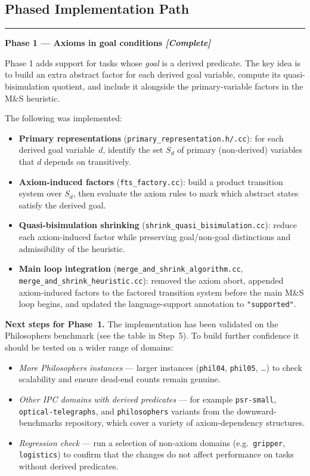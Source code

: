 \documentclass[11pt,a4paper]{article}
\begin{document}
\subsection{Phased Implementation Path}

\hrule\medskip
\noindent\textbf{Phase 1 — Axioms in goal conditions \hfill\textit{[Complete]}}
\medskip

Phase 1 adds support for tasks whose \emph{goal} is a derived predicate.  The
key idea is to build an extra abstract factor for each derived goal variable,
compute its quasi-bisimulation quotient, and include it alongside the
primary-variable factors in the M\&S heuristic.

The following was implemented:

\begin{itemize}
  \item \textbf{Primary representations} (\texttt{primary\_representation.h/.cc}):
    for each derived goal variable~$d$, identify the set $S_d$ of primary
    (non-derived) variables that $d$ depends on transitively.
  \item \textbf{Axiom-induced factors} (\texttt{fts\_factory.cc}): build a
    product transition system over $S_d$, then evaluate the axiom rules to
    mark which abstract states satisfy the derived goal.
  \item \textbf{Quasi-bisimulation shrinking}
    (\texttt{shrink\_quasi\_bisimulation.cc}): reduce each axiom-induced factor
    while preserving goal/non-goal distinctions and admissibility of the
    heuristic.
  \item \textbf{Main loop integration}
    (\texttt{merge\_and\_shrink\_algorithm.cc},
    \texttt{merge\_and\_shrink\_heuristic.cc}): removed the axiom abort,
    appended axiom-induced factors to the factored transition system before the
    main M\&S loop begins, and updated the language-support annotation to
    \texttt{"supported"}.
\end{itemize}

\label{sec:nextsteps}
\textbf{Next steps for Phase~1.}
The implementation has been validated on the Philosophers benchmark
(see the table in Step~5).  To build further confidence it should be tested on
a wider range of domains:

\begin{itemize}
  \item \emph{More Philosophers instances} — larger instances
    (\texttt{phil04}, \texttt{phil05}, \ldots) to check scalability and ensure
    dead-end counts remain genuine.
  \item \emph{Other IPC domains with derived predicates} — for example
    \texttt{psr-small}, \texttt{optical-telegraphs}, and \texttt{philosophers}
    variants from the downward-benchmarks repository, which cover a variety of
    axiom-dependency structures.
  \item \emph{Regression check} — run a selection of non-axiom domains (e.g.\
    \texttt{gripper}, \texttt{logistics}) to confirm that the changes do not
    affect performance on tasks without derived predicates.
\end{itemize}
\end{document}
